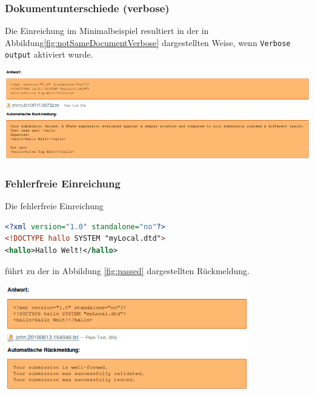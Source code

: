 \documentclass[a4paper]{scrartcl}
\newcommand{\anf}[1]{\glqq{}#1\grqq{}}
\begin{document}
      \subsubsection{Dokumentunterschiede (verbose)}
      Die Einreichung im Minimalbeispiel resultiert in der in Abbildung\ref{fig:notSameDocumentVerbose} dargestellten Weise, wenn \anf{\texttt{Verbose output}} aktiviert wurde.
  	  \begin{center}
        \captionsetup{type=figure}
	      \includegraphics[width=1\textwidth]{images/notSameDocumentVerbose.png}
	      \label{fig:notSameDocumentVerbose}
      \end{center}
  	  
  	  \subsubsection{Fehlerfreie Einreichung}
  	  Die fehlerfreie Einreichung
  	  \begin{lstlisting}[language=XML, captionpos=b, frame=tlRB, caption={Fehlerfreie Einreichung}]
<?xml version="1.0" standalone="no"?>
<!DOCTYPE hallo SYSTEM "myLocal.dtd">
<hallo>Hallo Welt!</hallo>
\end{lstlisting}
  	  führt zu der in Abbildung \ref{fig:passed} dargestellten Rückmeldung.
  	  \begin{center}
        \captionsetup{type=figure}
	      \includegraphics[width=0.8\textwidth]{images/passed.png}
	      \label{fig:passed}
      \end{center}
\end{document}
